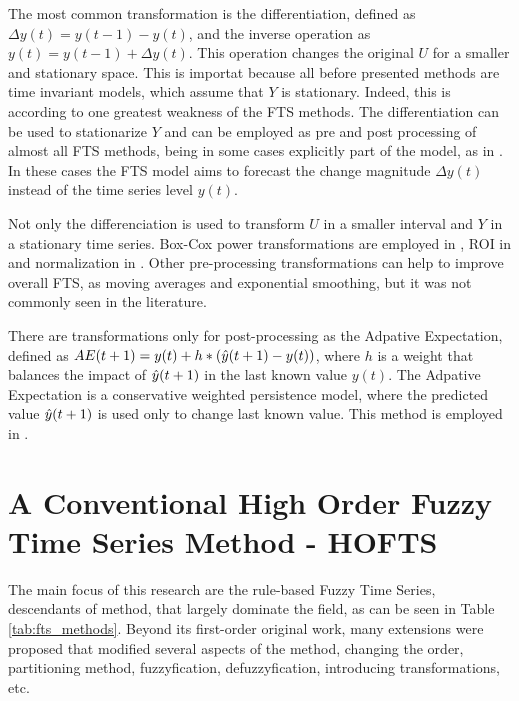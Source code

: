 The most common transformation is the differentiation, defined as $\Delta y(t) = y(t-1) - y(t)$, and the inverse operation as $y(t) = y(t-1) + \Delta y(t)$. This operation changes the original $U$ for a smaller and stationary space. This is importat because all before presented methods are time invariant models, which assume that $Y$ is stationary. Indeed, this is according to \cite{Duru2012} one greatest weakness of the FTS methods. The differentiation can be used to stationarize $Y$ and can be employed as pre and post processing of almost all FTS methods, being in some cases explicitly part of the model, as in \cite{Cheng2011, Lee2011, Sadaei2016}. In these cases the FTS model aims to forecast the change magnitude $\Delta y(t)$ instead of the time series level $y(t)$.

Not only the differenciation is used to transform $U$ in a smaller interval and $Y$ in a stationary time series. Box-Cox power transformations are employed in  \citep{Lee2013}, ROI in \cite{Sadaei2014a, Moyse2016} and normalization in \cite{Tran2018}. Other pre-processing transformations can help to improve overall FTS, as moving averages and exponential smoothing, but it was not commonly seen in the literature. 

There are transformations only for post-processing as the Adpative Expectation, defined as $AE(t+1) = y(t) + h*(\hat{y}(t+1) - y(t))$, where $h$ is a weight that balances the impact of $\hat{y}(t+1)$ in the last known value $y(t)$. The Adpative Expectation is a conservative weighted persistence model, where the predicted value $\hat{y}(t+1)$ is used only to change last known value. This method is employed in \cite{Cheng2008, Huang2011, Enayatifar2013, sadaei2014short, Singh2015, Sadaei2016, Ye2016, Yang2017, Bose2017}.


%
\section{A Conventional High Order Fuzzy Time Series Method - HOFTS}
\label{sec:fts_hofts}

The main focus of this research are the rule-based Fuzzy Time Series, descendants of \cite{chen1996forecasting} method, that  largely dominate the field, as can be seen in Table \ref{tab:fts_methods}. Beyond its first-order original work, many extensions were proposed that modified several aspects of the method, changing the order, partitioning method, fuzzyfication, defuzzyfication, introducing transformations, etc. 


